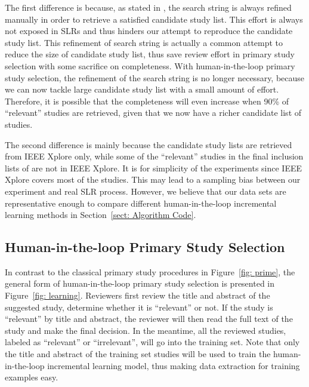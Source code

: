 \documentclass[final,twocolumn,5p]{elsarticle}
\theoremstyle{break}
\begin{document}
The first difference is because, as stated in \cite{wahono2015systematic}, the search string is always refined manually in order to retrieve a satisfied candidate study list. This effort is always not exposed in SLRs and thus hinders our attempt to reproduce the candidate study list. This refinement of search string is actually a common attempt to reduce the size of candidate study list, thus save review effort in primary study selection with some sacrifice on completeness. With human-in-the-loop primary study selection, the refinement of the search string is no longer necessary, because we can now tackle large candidate study list with a small amount of effort. Therefore, it is possible that the completeness will even increase when 90\% of ``relevant'' studies are retrieved, given that we now have a richer candidate list of studies.

The second difference is mainly because the candidate study lists are retrieved from IEEE Xplore only, while some of the ``relevant'' studies in the final inclusion lists of \cite{wahono2015systematic,hall2012systematic} are not in IEEE Xplore. It is for simplicity of the experiments since IEEE Xplore covers most of the studies. This may lead to a sampling bias between our experiment and real SLR process. However, we believe that our data sets are representative enough to compare different human-in-the-loop incremental learning methods in Section~\ref{sect: Algorithm Code}.

\subsection{Human-in-the-loop Primary Study Selection}
\label{subsect: Learning based Primary Study Selection}


In contrast to the classical primary study procedures in Figure~\ref{fig: prime}, the general form of human-in-the-loop primary study selection is presented in
Figure~\ref{fig: learning}. Reviewers first review the title and abstract of the
suggested study, determine whether it is ``relevant'' or not. If the study is
``relevant'' by title and abstract, the reviewer will then read the full text of
the study and make the final decision. In the meantime, all the reviewed
studies, labeled as ``relevant'' or ``irrelevant'', will go into the training
set. Note that only the title and abstract of the training set studies will be used to
train the human-in-the-loop incremental learning model, thus making data extraction for training examples easy.
\end{document}

